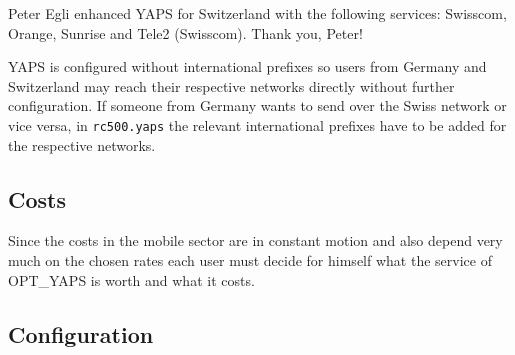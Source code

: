 Peter Egli enhanced YAPS for Switzerland with the following services: Swisscom,
Orange, Sunrise and Tele2 (Swisscom). Thank you, Peter!

YAPS is configured without international prefixes so users from Germany and
Switzerland may reach their respective networks directly without further
configuration. If someone from Germany wants to send over the Swiss network
or vice versa, in  \texttt{rc500.yaps} the relevant international prefixes have
to be added for the respective networks.

\subsection {Costs}
Since the costs in the mobile sector are in constant motion and also depend
very much on the chosen rates each user must decide for himself
what the service of OPT\_YAPS is worth and what it costs.



\subsection {Configuration}

